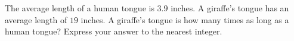 The average length of a human tongue is $3.9$ inches. A giraffe's tongue has an average length of $19$ inches. A giraffe's tongue is how many times as long as a human tongue? Express your answer to the nearest integer.
